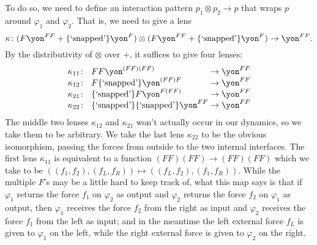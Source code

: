 \documentclass[Book-Poly]{subfiles}
\begin{document}
\begin{example}
To do so, we need to define an interaction pattern $p_1\otimes p_2\to p$ that wraps $p$ around $\varphi_1$ and $\varphi_2$.
That is, we need to give a lens
\[
    \kappa\colon (F\yon^{FF}+\{\text{`snapped'}\}\yon^F)\otimes (F\yon^{FF}+\{\text{`snapped'}\}\yon^F)\to\yon^{FF}.
\]
By the distributivity of $\otimes$ over $+$, it suffices to give four lenses:
\begin{equation}\label{eqn.snapped_maps}
\arraycolsep=1.4pt
\begin{array}{lll}
	\kappa_{11}\colon&~ FF\yon^{(FF)(FF)}&\to\yon^{FF}\\
	\kappa_{12}\colon&~ F\{\text{`snapped'}\}\yon^{(FF)F}&\to\yon^{FF}\\
	\kappa_{21}\colon&~ \{\text{`snapped'}\}F\yon^{F(FF)}&\to\yon^{FF}\\
	\kappa_{22}\colon&~ \{\text{`snapped'}\}\{\text{`snapped'}\}\yon^{FF}&\to\yon^{FF}
\end{array}
\end{equation}
The middle two lenses $\kappa_{12}$ and $\kappa_{21}$ won't actually occur in our dynamics, so we take them to be arbitrary.
We take the last lens $\kappa_{22}$ to be the obvious isomorphism, passing the forces from outside to the two internal interfaces.
The first lens $\kappa_{11}$ is equivalent to a function $(FF)(FF)\to (FF)(FF)$ which we take to be $((f_1,f_2),(f_L,f_R))\mapsto((f_L,f_2),(f_1,f_R))$.
While the multiple $F$'s may be a little hard to keep track of, what this map says is that if $\varphi_1$ returns the force $f_1$ on $\varphi_2$ as output and $\varphi_2$ returns the force $f_2$ on $\varphi_1$ as output, then $\varphi_1$ receives the force $f_2$ from the right as input and $\varphi_2$ receives the force $f_1$ from the left as input; and in the meantime the left external force $f_L$ is given to $\varphi_1$ on the left, while the right external force is given to $\varphi_2$ on the right.


\end{example}
\end{document}
